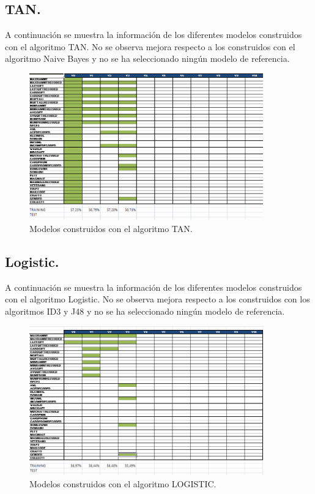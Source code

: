 \subsection{TAN.}

A continuación se muestra la información de los diferentes modelos construidos con el algoritmo TAN. No se observa mejora respecto a los construidos con el algoritmo Naive Bayes y no se ha seleccionado ningún modelo de referencia.

\begin{figure}[H]
\begin{center}
\includegraphics[width=0.9\textwidth]{img/tan-1}
\caption{Modelos construidos con el algoritmo TAN.}
\end{center}
\end{figure}

\subsection{Logistic.}

A continuación se muestra la información de los diferentes modelos construidos con el algoritmo Logistic. No se observa mejora respecto a los construidos con los algoritmos ID3 y J48 y no se ha seleccionado ningún modelo de referencia.

\begin{figure}[H]
\begin{center}
\includegraphics[width=0.9\textwidth]{img/logistic-2}
\caption{Modelos construidos con el algoritmo LOGISTIC.}
\end{center}
\end{figure}

